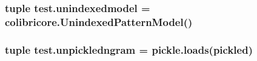 \subsubsection[{unindexedmodel}]{\setlength{\rightskip}{0pt plus 5cm}tuple test.\+unindexedmodel = colibricore.\+Unindexed\+Pattern\+Model()}\label{namespacetest_aed06428888223bbb3d645936625ebec8}
\hypertarget{namespacetest_a3fd9766be745abf941fa498c963c65ca}{}
\subsubsection[{unpickledngram}]{\setlength{\rightskip}{0pt plus 5cm}tuple test.\+unpickledngram = pickle.\+loads({\bf pickled})}\label{namespacetest_a3fd9766be745abf941fa498c963c65ca}
